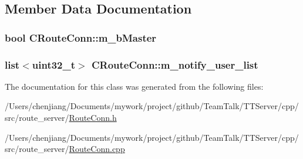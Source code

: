 \subsection{Member Data Documentation}
\hypertarget{class_c_route_conn_a3222e1b8253c2d3188abe1b1fb68265b}{}
\subsubsection[{m\+\_\+b\+Master}]{\setlength{\rightskip}{0pt plus 5cm}bool C\+Route\+Conn\+::m\+\_\+b\+Master\hspace{0.3cm}{\ttfamily [private]}}\label{class_c_route_conn_a3222e1b8253c2d3188abe1b1fb68265b}
\hypertarget{class_c_route_conn_a477c821fe62922f35bf4db7d78d69345}{}
\subsubsection[{m\+\_\+notify\+\_\+user\+\_\+list}]{\setlength{\rightskip}{0pt plus 5cm}list$<$uint32\+\_\+t$>$ C\+Route\+Conn\+::m\+\_\+notify\+\_\+user\+\_\+list\hspace{0.3cm}{\ttfamily [private]}}\label{class_c_route_conn_a477c821fe62922f35bf4db7d78d69345}


The documentation for this class was generated from the following files\+:\begin{DoxyCompactItemize}
\item 
/\+Users/chenjiang/\+Documents/mywork/project/github/\+Team\+Talk/\+T\+T\+Server/cpp/src/route\+\_\+server/\hyperlink{_route_conn_8h}{Route\+Conn.\+h}\item 
/\+Users/chenjiang/\+Documents/mywork/project/github/\+Team\+Talk/\+T\+T\+Server/cpp/src/route\+\_\+server/\hyperlink{_route_conn_8cpp}{Route\+Conn.\+cpp}\end{DoxyCompactItemize}
